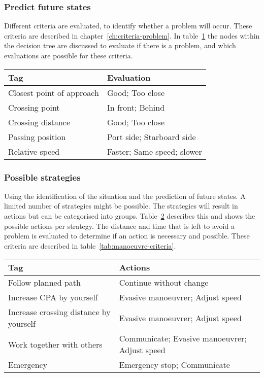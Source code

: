 \subsubsection{Predict future states}
Different criteria are evaluated, to identify whether a problem will occur. These criteria are described in chapter~\ref{ch:criteria-problem}. In table~\ref{tab:identification-criteria} the nodes within the decision tree are discussed to evaluate if there is a problem, and which evaluations are possible for these criteria. 
\begin{table}[H]
	\begin{tabular}{p{}|p{}}
		\toprule
		Tag & Evaluation \\
		\midrule
		Closest point of approach & Good; Too close \\
		Crossing point & In front; Behind \\
		Crossing distance & Good; Too close \\
		Passing position & Port side; Starboard side \\
		Relative speed & Faster; Same speed; slower \\
		\bottomrule
	\end{tabular}
	
	\label{tab:identification-criteria}
\end{table}

\subsubsection{Possible strategies}
Using the identification of the situation and the prediction of future states. A limited number of strategies might be possible. The strategies will result in actions but can be categorised into groups. Table~\ref{tab:strategies} describes this and shows the possible actions per strategy. The distance and time that is left to avoid a problem is evaluated to determine if an action is necessary and possible. These criteria are described in table~\ref{tab:manoeuvre-criteria}.
\begin{table}[H]
	\begin{tabular}{p{}|p{}}
		\toprule
		Tag & Actions \\
		\midrule
		Follow planned path & Continue without change\\
		Increase CPA by yourself & Evasive manoeuvrer; Adjust speed \\
		Increase crossing distance by yourself & Evasive manoeuvrer; Adjust speed \\
		Work together with others & Communicate; Evasive manoeuvrer; Adjust speed \\
		Emergency & Emergency stop; Communicate \\
		\bottomrule
	\end{tabular}
	
	\label{tab:strategies}
\end{table}

